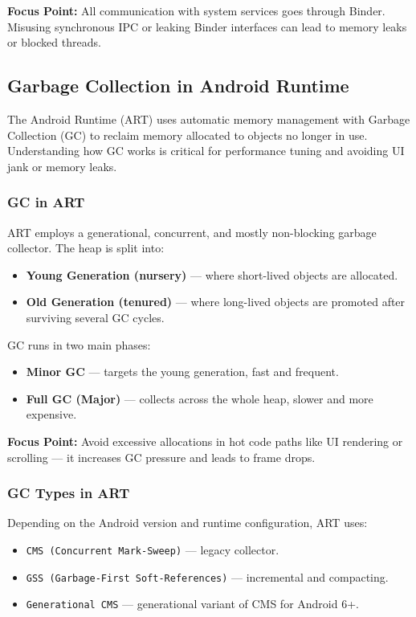 \documentclass[a4paper,12pt]{article}
\begin{document}
\textbf{Focus Point:} All communication with system services goes through Binder. Misusing synchronous IPC or leaking Binder interfaces can lead to memory leaks or blocked threads.

\subsection{Garbage Collection in Android Runtime}

The Android Runtime (ART) uses automatic memory management with Garbage Collection (GC) to reclaim memory allocated to objects no longer in use. Understanding how GC works is critical for performance tuning and avoiding UI jank or memory leaks.

\subsubsection{GC in ART}

ART employs a generational, concurrent, and mostly non-blocking garbage collector. The heap is split into:

\begin{itemize}
  \item \textbf{Young Generation (nursery)} — where short-lived objects are allocated.
  \item \textbf{Old Generation (tenured)} — where long-lived objects are promoted after surviving several GC cycles.
\end{itemize}

GC runs in two main phases:
\begin{itemize}
  \item \textbf{Minor GC} — targets the young generation, fast and frequent.
  \item \textbf{Full GC (Major)} — collects across the whole heap, slower and more expensive.
\end{itemize}

\textbf{Focus Point:} Avoid excessive allocations in hot code paths like UI rendering or scrolling — it increases GC pressure and leads to frame drops.

\subsubsection{GC Types in ART}

Depending on the Android version and runtime configuration, ART uses:

\begin{itemize}
  \item \texttt{CMS (Concurrent Mark-Sweep)} — legacy collector.
  \item \texttt{GSS (Garbage-First Soft-References)} — incremental and compacting.
  \item \texttt{Generational CMS} — generational variant of CMS for Android 6+.
\end{itemize}
\end{document}
